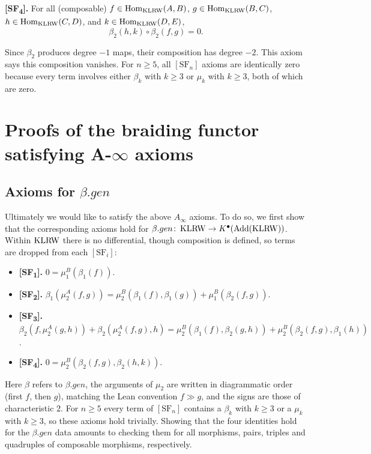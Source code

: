 \textbf{[SF\textsubscript{4}].}
For all (composable) $f \in \operatorname{Hom}_{\operatorname{KLRW}}(A, B)$,
$g \in \operatorname{Hom}_{\operatorname{KLRW}}(B, C)$, $h \in \operatorname{Hom}_{\operatorname{KLRW}}(C, D)$, and
$k \in \operatorname{Hom}_{\operatorname{KLRW}}(D, E)$,
$$
  \beta_2(h, k) \circ \beta_2(f, g)= 0.
$$

\begin{remark}
  Since $\beta_2$ produces degree $-1$ maps, their composition has degree
  $-2$. This axiom says this composition vanishes. For $n \geq 5$, all $[\mathrm{SF}_n]$ axioms are
  identically zero because every term involves either $\beta_k$
  with $k \geq 3$ or $\mu_k$ with $k \geq 3$, both of which are zero.
\end{remark}

\begin{remark}

\end{remark}

\section{Proofs of the braiding functor satisfying A-\texorpdfstring{$\infty$}{infinity} axioms}

\subsection{Axioms for \texorpdfstring{$\beta.gen$}{beta.gen}}
Ultimately we would like to satisfy the above $A_\infty$ axioms. To do so, we first show that the
corresponding axioms hold for $\beta.gen\colon \operatorname{KLRW} \to K^\bullet(\operatorname{Add}(\operatorname{KLRW}))$.
Within $\operatorname{KLRW}$ there is no differential, though composition is defined, so terms are dropped from
each $[\mathrm{SF}_i]$:
\begin{itemize}
    \item \textbf{[SF\textsubscript{1}].}
    $0 = \mu_1^B(\beta_1(f))$.
    \item \textbf{[SF\textsubscript{2}].}
    $\beta_1(\mu_2^A(f, g)) = \mu_2^B(\beta_1(f), \beta_1(g)) + \mu_1^B(\beta_2(f, g))$.
    \item \textbf{[SF\textsubscript{3}].}
    $\beta_2(f, \mu_2^A(g, h)) + \beta_2 (\mu_2^A(f, g), h)
      = \mu_2^B(\beta_1(f), \beta_2(g, h)) + \mu_2^B(\beta_2(f, g), \beta_1(h))$.
    \item \textbf{[SF\textsubscript{4}].}
    $0 = \mu_2^B(\beta_2(f, g), \beta_2(h, k))$.
\end{itemize}
Here $\beta$ refers to $\beta.gen$, the arguments of $\mu_2$ are written in diagrammatic order
(first $f$, then $g$), matching the Lean convention $f \gg g$, and the signs are those of
characteristic $2$. For $n \ge 5$ every term of $[\mathrm{SF}_n]$ contains a $\beta_k$ with
$k \ge 3$ or a $\mu_k$ with $k \ge 3$, so these axioms hold trivially. Showing that the four
identities hold for the $\beta.gen$ data amounts to checking them for all morphisms, pairs,
triples and quadruples of composable morphisms, respectively.

